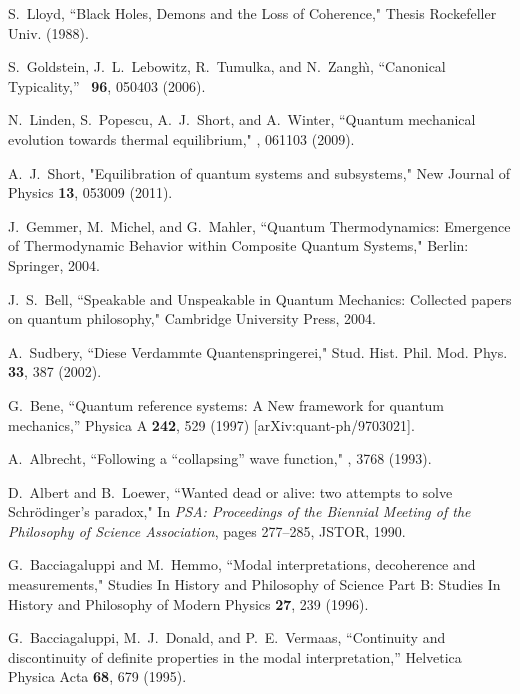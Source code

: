 \documentclass[%
preprint,
nofootinbib,
 amsmath,amssymb,
aps,
]{revtex4-1}
\begin{document}
\begin{thebibliography}{10}
S.~Lloyd, ``Black Holes, Demons and the Loss of Coherence," Thesis Rockefeller
Univ. (1988).


S.~Goldstein, J.~L.~Lebowitz, R.~Tumulka, and N.~Zangh\`\i, ``Canonical Typicality,''
   \prl \ {\bf 96}, 050403 (2006).

N.~Linden, S.~Popescu, A.~J.~Short, and A.~Winter,
   ``Quantum mechanical evolution towards thermal equilibrium,"
   , 061103 (2009).

A.~J.~Short, "Equilibration of quantum systems and subsystems," New Journal of Physics {\bf13}, 053009 (2011).

J.~Gemmer, M.~Michel, and G.~Mahler, 
``Quantum Thermodynamics: Emergence of Thermodynamic Behavior within Composite Quantum Systems," Berlin: Springer, 2004.


J.~S.~Bell,
   ``Speakable and Unspeakable in Quantum Mechanics: Collected
  papers on quantum philosophy,"
   Cambridge University Press, 2004.

A.~Sudbery,
   ``Diese Verdammte Quantenspringerei,"
   Stud. Hist. Phil. Mod. Phys. {\bf33}, 387 (2002).

  G.~Bene,
  ``Quantum reference systems: A New framework for quantum mechanics,'' Physica A {\bf242}, 529 (1997) [arXiv:quant-ph/9703021].
  
A.~Albrecht,
   ``Following a ``collapsing'' wave function,"
   , 3768 (1993).

D.~Albert and B.~Loewer,
   ``Wanted dead or alive: two attempts to solve Schr\"odinger's paradox,"
   In {\em PSA: Proceedings of the Biennial Meeting of the Philosophy of
  Science Association}, pages 277--285, JSTOR, 1990.

G.~Bacciagaluppi and M.~Hemmo,
   ``Modal interpretations, decoherence and measurements,"
   Studies In History and Philosophy of Science Part B: Studies In
  History and Philosophy of Modern Physics {\bf 27}, 239 (1996).

G.~Bacciagaluppi, M.~J.~Donald, and P.~E.~Vermaas,
   ``Continuity and discontinuity of definite properties in the modal
  interpretation,'' Helvetica Physica Acta {\bf68}, 679 (1995).


\end{thebibliography}
\end{document}
